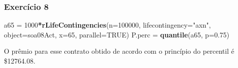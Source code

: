 \documentclass[]{article}
\newenvironment{Shaded}{\begin{snugshade}}{\end{snugshade}}
\newcommand{\DataTypeTok}[1]{\textcolor[rgb]{0.13,0.29,0.53}{#1}}
\newcommand{\DecValTok}[1]{\textcolor[rgb]{0.00,0.00,0.81}{#1}}
\newcommand{\FloatTok}[1]{\textcolor[rgb]{0.00,0.00,0.81}{#1}}
\newcommand{\KeywordTok}[1]{\textcolor[rgb]{0.13,0.29,0.53}{\textbf{#1}}}
\newcommand{\NormalTok}[1]{#1}
\newcommand{\OperatorTok}[1]{\textcolor[rgb]{0.81,0.36,0.00}{\textbf{#1}}}
\newcommand{\OtherTok}[1]{\textcolor[rgb]{0.56,0.35,0.01}{#1}}
\newcommand{\StringTok}[1]{\textcolor[rgb]{0.31,0.60,0.02}{#1}}
\begin{document}
\hypertarget{exercicio-8}{%
\subsubsection{Exercício 8}\label{exercicio-8}}

\begin{Shaded}
\begin{Highlighting}[]
\NormalTok{a65 =}\StringTok{ }\DecValTok{1000}\OperatorTok{*}\KeywordTok{rLifeContingencies}\NormalTok{(}\DataTypeTok{n=}\DecValTok{100000}\NormalTok{, }\DataTypeTok{lifecontingency=}\StringTok{"axn"}\NormalTok{, }\DataTypeTok{object=}\NormalTok{soa08Act,}
                              \DataTypeTok{x=}\DecValTok{65}\NormalTok{, }\DataTypeTok{parallel=}\OtherTok{TRUE}\NormalTok{)}
\NormalTok{P.perc =}\StringTok{ }\KeywordTok{quantile}\NormalTok{(a65, }\DataTypeTok{p=}\FloatTok{0.75}\NormalTok{)}
\end{Highlighting}
\end{Shaded}

O prêmio para esse contrato obtido de acordo com o princípio do
percentil é \$12764.08.
\end{document}
